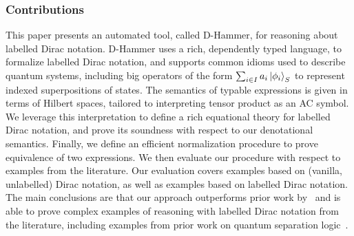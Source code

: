 \subsubsection*{Contributions}
This paper presents an automated tool, called D-Hammer, for reasoning
about labelled Dirac notation. D-Hammer uses a rich, dependently typed
language, to formalize labelled Dirac notation, and supports common
idioms used to describe quantum systems, including big operators of
the form $\sum_{i\in I} a_i \ket{\phi_i}_S$ to represent indexed
superpositions of states. The semantics of typable expressions is
given in terms of Hilbert spaces, tailored to interpreting tensor
product as an AC symbol. We leverage this interpretation to define a
rich equational theory for labelled Dirac notation, and prove its
soundness with respect to our denotational semantics. Finally, we
define an efficient normalization procedure to prove equivalence of
two expressions. We then evaluate our procedure with respect to
examples from the literature. Our evaluation covers examples based on
(vanilla, unlabelled) Dirac notation, as well as examples based on
labelled Dirac notation. The main conclusions are that our approach
outperforms prior work by~\cite{diracdec} and is able to prove complex
examples of reasoning with labelled Dirac notation from the
literature, including examples from prior work on quantum separation
logic~\cite{DBLP:conf/lics/ZhouBHYY21}.






